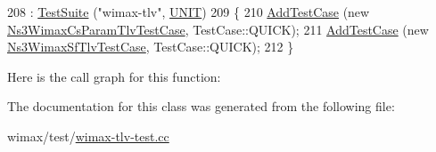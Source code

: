\begin{DoxyCode}
208   : \hyperlink{classns3_1_1TestSuite_a904b0c40583b744d30908aeb94636d1a}{TestSuite} (\textcolor{stringliteral}{"wimax-tlv"}, \hyperlink{classns3_1_1TestSuite_a1ebfcab34ec8161e085e8e3a1855eae0a3885375a3787abf60431f8454b3cadbd}{UNIT})
209 \{
210   \hyperlink{classns3_1_1TestCase_a3718088e3eefd5d6454569d2e0ddd835}{AddTestCase} (\textcolor{keyword}{new} \hyperlink{classNs3WimaxCsParamTlvTestCase}{Ns3WimaxCsParamTlvTestCase}, TestCase::QUICK);
211   \hyperlink{classns3_1_1TestCase_a3718088e3eefd5d6454569d2e0ddd835}{AddTestCase} (\textcolor{keyword}{new} \hyperlink{classNs3WimaxSfTlvTestCase}{Ns3WimaxSfTlvTestCase}, TestCase::QUICK);
212 \}
\end{DoxyCode}


Here is the call graph for this function\+:




The documentation for this class was generated from the following file\+:\begin{DoxyCompactItemize}
\item 
wimax/test/\hyperlink{wimax-tlv-test_8cc}{wimax-\/tlv-\/test.\+cc}\end{DoxyCompactItemize}
